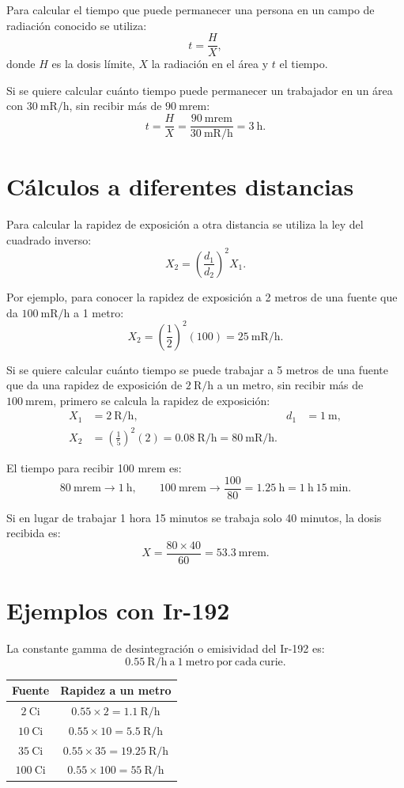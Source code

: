 Para calcular el tiempo que puede permanecer una persona en un campo de radiación conocido se utiliza:
\[
t=\frac{H}{X},
\]
donde $H$ es la dosis límite, $X$ la radiación en el área y $t$ el tiempo.

Si se quiere calcular cuánto tiempo puede permanecer un trabajador en un área con $30\ \mathrm{mR/h}$, sin recibir más de $90\ \mathrm{mrem}$:
\[
t=\frac{H}{X}=\frac{90\ \mathrm{mrem}}{30\ \mathrm{mR/h}}=3\ \text{h}.
\]

\section{Cálculos a diferentes distancias}

Para calcular la rapidez de exposición a otra distancia se utiliza la ley del cuadrado inverso:
\[
X_2=\left(\frac{d_1}{d_2}\right)^2X_1.
\]

Por ejemplo, para conocer la rapidez de exposición a 2 metros de una fuente que da $100\ \mathrm{mR/h}$ a 1 metro:
\[
X_2=\left(\frac{1}{2}\right)^2(100)=25\ \mathrm{mR/h}.
\]

Si se quiere calcular cuánto tiempo se puede trabajar a 5 metros de una fuente que da una rapidez de exposición de $2\ \mathrm{R/h}$ a un metro, sin recibir más de $100\ \mathrm{mrem}$, primero se calcula la rapidez de exposición:
\begin{align*}
X_1 &= 2\ \mathrm{R/h}, & d_1&=1\ \mathrm{m},\\
X_2 &= \left(\frac{1}{5}\right)^2(2)=0.08\ \mathrm{R/h}=80\ \mathrm{mR/h}.
\end{align*}

El tiempo para recibir 100 mrem es:
\[
80\ \mathrm{mrem}\longrightarrow 1\ \mathrm{h},\qquad
100\ \mathrm{mrem}\longrightarrow \frac{100}{80}=1.25\ \mathrm{h}=1\ \mathrm{h}\ 15\ \mathrm{min}.
\]

Si en lugar de trabajar 1 hora 15 minutos se trabaja solo 40 minutos, la dosis recibida es:
\[
X=\frac{80\times40}{60}=53.3\ \mathrm{mrem}.
\]

\section{Ejemplos con Ir-192}

La constante gamma de desintegración o emisividad del Ir-192 es:
\[
0.55\ \mathrm{R/h\ a\ 1\ metro\ por\ cada\ curie}.
\]

\begin{center}
\begin{tabular}{cc}
\textbf{Fuente} & \textbf{Rapidez a un metro} \\
\hline
$2\ \mathrm{Ci}$   & $0.55\times2=1.1\ \mathrm{R/h}$ \\
$10\ \mathrm{Ci}$  & $0.55\times10=5.5\ \mathrm{R/h}$ \\
$35\ \mathrm{Ci}$  & $0.55\times35=19.25\ \mathrm{R/h}$ \\
$100\ \mathrm{Ci}$ & $0.55\times100=55\ \mathrm{R/h}$ \\
\end{tabular}
\end{center}

